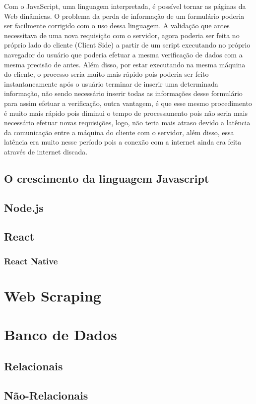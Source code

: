 Com o JavaScript, uma linguagem interpretada, é possível tornar as páginas da Web dinâmicas. O problema da perda de informação de um formulário poderia ser facilmente corrigido com o uso dessa linguagem. A validação que antes necessitava de uma nova requisição com o servidor, agora poderia ser feita no próprio lado do cliente (Client Side) a partir de um script executando no próprio navegador do usuário que poderia efetuar a mesma verificação de dados com a mesma precisão de antes. Além disso, por estar executando na mesma máquina do cliente, o processo seria muito mais rápido pois poderia ser feito instantaneamente após o usuário terminar de inserir uma determinada informação, não sendo necessário inserir todas as informações desse formulário para assim efetuar a verificação, outra vantagem, é que esse mesmo procedimento é muito mais rápido pois diminui o tempo de processamento pois não seria mais necessário efetuar novas requisições, logo, não teria mais atraso devido a latência da comunicação entre a máquina do cliente com o servidor, além disso, essa latência era muito nesse período pois a conexão com a internet ainda era feita através de internet discada.\\



\subsection{O crescimento da linguagem Javascript}

\subsection{Node.js}

\subsection{React}

\subsubsection{React Native}

\section{Web Scraping}

\section{Banco de Dados}

\subsection{Relacionais}

\subsection{Não-Relacionais}